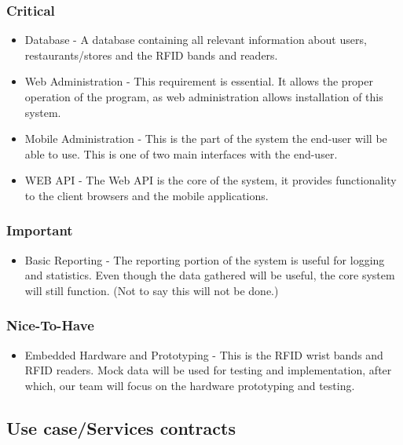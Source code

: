\documentclass[11pt,titlepage]{article} %
\begin{document}
	\subsubsection{Critical}
\begin{itemize}
\item Database - A database containing all relevant information about users, restaurants/stores and the RFID bands and readers.
\item Web Administration - This requirement is essential. It allows the proper operation of the program, as web administration allows installation of this system.
\item Mobile Administration - This is the part of the system the end-user will be able to use. This is one of two main interfaces with the end-user.
\item WEB API - The Web API is the core of the system, it provides functionality to the client browsers and the mobile applications.
\end{itemize}

	\subsubsection{Important}
\begin{itemize}
\item Basic Reporting - The reporting portion of the system is useful for logging and statistics. Even though the data gathered will be useful, the core system will still function. (Not to say this will not be done.)
\end{itemize}

	\subsubsection{Nice-To-Have}
\begin{itemize}
\item Embedded Hardware and Prototyping - This is the RFID wrist bands and RFID readers. Mock data will be used for testing and implementation, after which, our team will focus on the hardware prototyping and testing.
\end{itemize}


\subsection{Use case/Services contracts}
\end{document}
